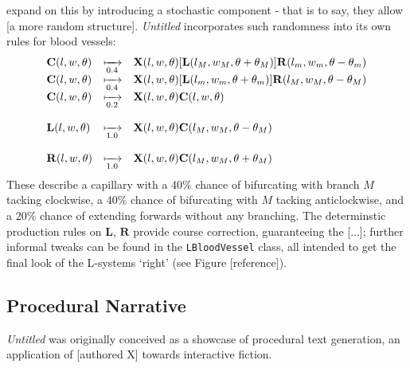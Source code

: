\documentclass[a4paper, 11pt]{article}
\begin{document}
\begin{flushleft}
\vspace{5pt}\noindent
\citet{liuSimulationBloodVessels} expand on this by introducing a stochastic component - that is to say, they allow [a more random structure]. \textit{Untitled} incorporates such randomness into its own rules for blood vessels:
$$\begin{matrix*}[l]
\mathbf{C}(l,w,\theta) &\xmapsto[0.4]{} &\mathbf{X}(l,w,\theta)[\mathbf{L}(l_M,w_M,\theta+\theta_M)]\mathbf{R}(l_m,w_m,\theta-\theta_m) \\
\mathbf{C}(l,w,\theta) &\xmapsto[0.4]{} &\mathbf{X}(l,w,\theta)[\mathbf{L}(l_m,w_m,\theta+\theta_m)]\mathbf{R}(l_M,w_M,\theta-\theta_M) \\
\mathbf{C}(l,w,\theta) &\xmapsto[0.2]{} &\mathbf{X}(l,w,\theta)\mathbf{C}(l,w,\theta) \\
& & \\
\mathbf{L}(l,w,\theta) &\xmapsto[1.0]{} &\mathbf{X}(l,w,\theta)\mathbf{C}(l_M,w_M,\theta-\theta_M) \\
& & \\
\mathbf{R}(l,w,\theta) &\xmapsto[1.0]{} &\mathbf{X}(l,w,\theta)\mathbf{C}(l_M,w_M,\theta+\theta_M)
\end{matrix*}$$
These describe a capillary with a 40\% chance of bifurcating with branch $M$ tacking clockwise, a 40\% chance of bifurcating with $M$ tacking anticlockwise, and a 20\% chance of extending forwards without any branching. The determinstic production rules on $\mathbf{L}$, $\mathbf{R}$ provide course correction, guaranteeing the [...]; further informal tweaks can be found in the \texttt{LBloodVessel} class, all intended to get the final look of the L-systems `right' (see Figure [reference]). 

\vspace{5pt}

\vspace{5pt}

\vspace{5pt}

\subsection{Procedural Narrative} %

\textit{Untitled} was originally conceived as a showcase of procedural text generation, an application of [authored X] towards interactive fiction. 


\end{flushleft}
\end{document}
